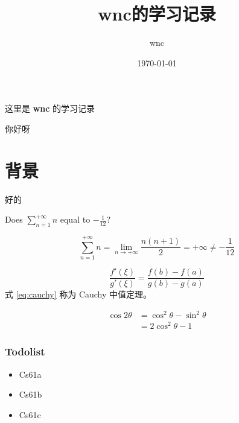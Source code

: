 \documentclass{ctexart}
\title{wnc的学习记录}
\author{wnc}
\date{\today}
\begin{document}
\maketitle
\newpage

\tableofcontents
\newpage

  这里是 {\bfseries \huge wnc} 的学习记录 \par 你好呀

\part[short]{背景}

好的

Does $\sum_{n=1}^{+\infty} n$ equal to \(-\frac{1}{12} \)?

\[    \sum_{n=1}^{+\infty} n
    = \lim_{n\to+\infty}\frac{n(n+1)}{2}
    = +\infty \neq -\frac{1}{12} \]

\begin{equation} \label{eq:cauchy}
    \frac{f'(\xi)}{g'(\xi)} =
      \frac{f(b) - f(a)}{g(b) - g(a)}
\end{equation}
式 \eqref{eq:cauchy} 称为 Cauchy 中值定理。

\begin{align}
    \cos 2\theta
    &= \cos^2 \theta - \sin^2 \theta \\
    &= 2 \cos^2 \theta -1
\end{align}

\section[short]{Todolist}

  \begin{itemize}
    \item Cs61a
    \item Cs61b
    \item Cs61c
  \end{itemize}
\end{document}
